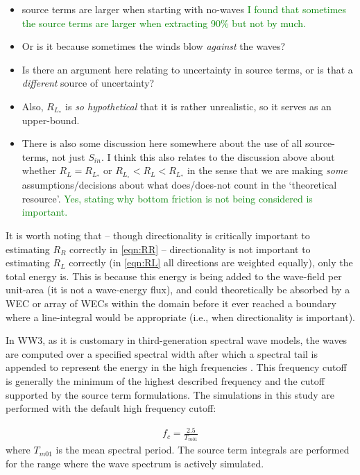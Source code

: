 \begin{itemize}
\item source terms are larger when starting with no-waves  \textcolor{green}{I found that sometimes the source terms are larger when extracting 90\% but not by much.}
\item Or is it because sometimes the winds blow {\em against} the waves?
\item Is there an argument here relating to uncertainty in source terms, or is that a {\em different} source of uncertainty?
\item Also, $R_{L_*}$ is {\em so hypothetical} that it is rather unrealistic, so it serves as an upper-bound.
\item There is also some discussion here somewhere about the use of all source-terms, not just $S_{in}$. I think this also relates to the discussion above about whether $R_L = R_{L_*}$ or $R_{L_\circ} < R_L < R_{L_*}$ in the sense that we are making {\em some} assumptions/decisions about what does/does-not count in the `theoretical resource'.  \textcolor{green}{Yes, stating why bottom friction is not being considered is important.}
\end{itemize}

It is worth noting that -- though directionality is critically important to estimating $R_R$ correctly in \eqref{eqn:RR} -- directionality is not important to estimating $R_L$ correctly (in \eqref{eqn:RL} all directions are weighted equally), only the total energy is. This is because this energy is being added to the wave-field per unit-area (it is not a wave-energy flux), and could theoretically be absorbed by a WEC or array of WECs within the domain before it ever reached a boundary where a line-integral would be appropriate (i.e., when directionality is important).

In WW3, as it is customary in third-generation spectral wave models, the waves are computed over a specified spectral width after which a spectral tail is appended to represent the energy in the high frequencies \citep[e.g.][]{ardhuinObservationSwellDissipation2009}. This frequency cutoff is generally the minimum of the highest described frequency and the cutoff supported by the source term formulations. The simulations in this study are performed with the default high frequency cutoff:

\begin{align}
  f_{c} = \frac{2.5}{T_{m01}}
\end{align}
where $T_{m01}$ is the mean spectral period. The source term integrals are performed for the range where the wave spectrum is actively simulated.

